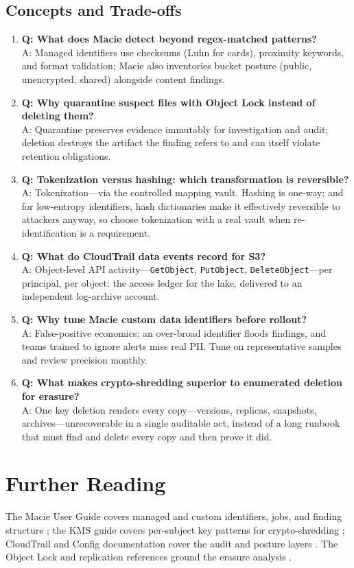 \subsection{Concepts and Trade-offs}
\begin{enumerate}
    \item \textbf{Q: What does Macie detect beyond regex-matched patterns?}\\
    A: Managed identifiers use checksums (Luhn for cards), proximity keywords, and format validation; Macie also inventories bucket posture (public, unencrypted, shared) alongside content findings.
    \item \textbf{Q: Why quarantine suspect files with Object Lock instead of deleting them?}\\
    A: Quarantine preserves evidence immutably for investigation and audit; deletion destroys the artifact the finding refers to and can itself violate retention obligations.
    \item \textbf{Q: Tokenization versus hashing: which transformation is reversible?}\\
    A: Tokenization---via the controlled mapping vault. Hashing is one-way; and for low-entropy identifiers, hash dictionaries make it effectively reversible to attackers anyway, so choose tokenization with a real vault when re-identification is a requirement.
    \item \textbf{Q: What do CloudTrail data events record for S3?}\\
    A: Object-level API activity---\texttt{GetObject}, \texttt{PutObject}, \texttt{DeleteObject}---per principal, per object: the access ledger for the lake, delivered to an independent log-archive account.
    \item \textbf{Q: Why tune Macie custom data identifiers before rollout?}\\
    A: False-positive economics: an over-broad identifier floods findings, and teams trained to ignore alerts miss real PII. Tune on representative samples and review precision monthly.
    \item \textbf{Q: What makes crypto-shredding superior to enumerated deletion for erasure?}\\
    A: One key deletion renders every copy---versions, replicas, snapshots, archives---unrecoverable in a single auditable act, instead of a long runbook that must find and delete every copy and then prove it did.
\end{enumerate}

\section{Further Reading}
The Macie User Guide covers managed and custom identifiers, jobs, and finding structure \cite{awsMacieDocs}; the KMS guide covers per-subject key patterns for crypto-shredding \cite{awsKMSDocs}; CloudTrail and Config documentation cover the audit and posture layers \cite{awsCloudTrailDocs,awsConfigDocs}. The Object Lock and replication references ground the erasure analysis \cite{awsS3ObjectLock,awsS3Replication}.

